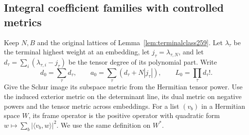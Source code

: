 \documentclass[a4paper,11pt]{article}
\theoremstyle{definition}
\theoremstyle{remark}
\numberwithin{equation}{section}
\begin{document}
\subsection{Integral coefficient families with controlled metrics}\label{nav:IV-36}
Keep \(N,B\) and the original lattices of
Lemma~\ref{lem:terminalclass259}. Let \(\lambda_\tau\) be the
terminal highest weight at an embedding, let
\(j_\tau=\lambda_{\tau,N}\), and let \(d_\tau=\sum_i
(\lambda_{\tau,i}-j_\tau)\) be the tensor degree of its
polynomial part. Write
\[
          d_0=\sum_\tau d_\tau,\qquad
          a_0=\sum_\tau(d_\tau+N|j_\tau|),\qquad
          L_0=\prod_\tau d_\tau! .
\]
Give the Schur image its subspace metric from the Hermitian
tensor power. Use the induced exterior metric on the determinant
line, its dual metric on negative powers and the tensor metric
across embeddings. For a list \((v_b)\) in a Hermitian space
\(W\), its frame operator is the positive operator with
quadratic form \(w\mapsto\sum_b|\langle v_b,w\rangle|^2\).
We use the same definition on \(W^*\).
\end{document}
